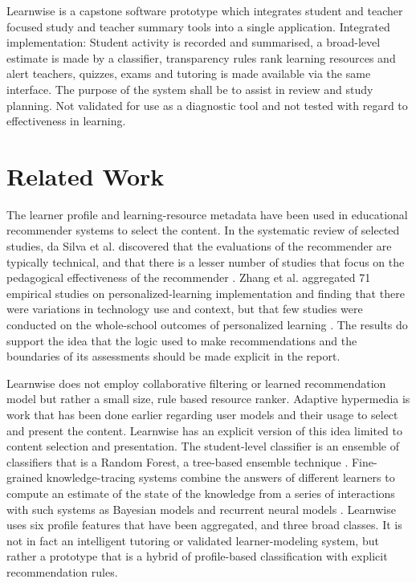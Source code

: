 \documentclass[conference]{IEEEtran}
\begin{document}
Learnwise is a capstone software prototype which integrates student and teacher focused study and teacher summary tools into a single application. Integrated implementation: Student activity is recorded and summarised, a broad-level estimate is made by a classifier, transparency rules rank learning resources and alert teachers, quizzes, exams and tutoring is made available via the same interface. The purpose of the system shall be to assist in review and study planning. Not validated for use as a diagnostic tool and not tested with regard to effectiveness in learning.

\section{Related Work}
The learner profile and learning-resource metadata have been used in educational recommender systems to select the content. In the systematic review of selected studies, da Silva et al. discovered that the evaluations of the recommender are typically technical, and that there is a lesser number of studies that focus on the pedagogical effectiveness of the recommender \cite{dasilva2023}. Zhang et al. aggregated 71 empirical studies on personalized-learning implementation and finding that there were variations in technology use and context, but that few studies were conducted on the whole-school outcomes of personalized learning \cite{zhang2020}. The results do support the idea that the logic used to make recommendations and the boundaries of its assessments should be made explicit in the report.

Learnwise does not employ collaborative filtering or learned recommendation model but rather a small size, rule based resource ranker. Adaptive hypermedia \cite{brusilovsky2001} is work that has been done earlier regarding user models and their usage to select and present the content. Learnwise has an explicit version of this idea limited to content selection and presentation. The student-level classifier is an ensemble of classifiers that is a Random Forest, a tree-based ensemble technique \cite{breiman2001}. Fine-grained knowledge-tracing systems combine the answers of different learners to compute an estimate of the state of the knowledge from a series of interactions with such systems as Bayesian models and recurrent neural models \cite{corbett1995,piech2015}. Learnwise uses six profile features that have been aggregated, and three broad classes. It is not in fact an intelligent tutoring or validated learner-modeling system, but rather a prototype that is a hybrid of profile-based classification with explicit recommendation rules.
\end{document}

